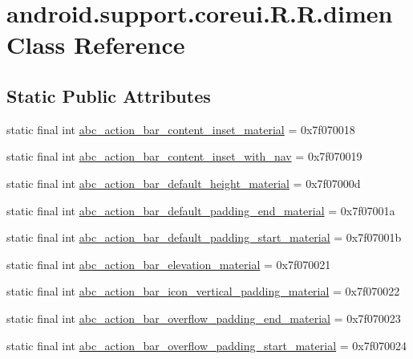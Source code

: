 \hypertarget{classandroid_1_1support_1_1coreui_1_1_r_1_1dimen}{
\section{android.support.coreui.R.R.dimen Class Reference}
\label{classandroid_1_1support_1_1coreui_1_1_r_1_1dimen}
}
\subsection*{Static Public Attributes}
\begin{CompactItemize}
\item 
static final int \hyperlink{classandroid_1_1support_1_1coreui_1_1_r_1_1dimen_fa350275f25a44560f38817ff804a061}{abc\_\-action\_\-bar\_\-content\_\-inset\_\-material} = 0x7f070018
\item 
static final int \hyperlink{classandroid_1_1support_1_1coreui_1_1_r_1_1dimen_1499a2f51bf856a887c30fd877b9d5e7}{abc\_\-action\_\-bar\_\-content\_\-inset\_\-with\_\-nav} = 0x7f070019
\item 
static final int \hyperlink{classandroid_1_1support_1_1coreui_1_1_r_1_1dimen_caaff50f509d06e5db94aa774f7b1ed2}{abc\_\-action\_\-bar\_\-default\_\-height\_\-material} = 0x7f07000d
\item 
static final int \hyperlink{classandroid_1_1support_1_1coreui_1_1_r_1_1dimen_66730a1f40aa895cab3428c160e5e4d1}{abc\_\-action\_\-bar\_\-default\_\-padding\_\-end\_\-material} = 0x7f07001a
\item 
static final int \hyperlink{classandroid_1_1support_1_1coreui_1_1_r_1_1dimen_818c0a80bc19f3c7a2022ad31897beaa}{abc\_\-action\_\-bar\_\-default\_\-padding\_\-start\_\-material} = 0x7f07001b
\item 
static final int \hyperlink{classandroid_1_1support_1_1coreui_1_1_r_1_1dimen_5a1d6fc34d41d8a557a43a7d74b7e91c}{abc\_\-action\_\-bar\_\-elevation\_\-material} = 0x7f070021
\item 
static final int \hyperlink{classandroid_1_1support_1_1coreui_1_1_r_1_1dimen_19c465d67f6e71cab1421af99f91b1e5}{abc\_\-action\_\-bar\_\-icon\_\-vertical\_\-padding\_\-material} = 0x7f070022
\item 
static final int \hyperlink{classandroid_1_1support_1_1coreui_1_1_r_1_1dimen_54084ec37722997f7aae6b2c005fe00a}{abc\_\-action\_\-bar\_\-overflow\_\-padding\_\-end\_\-material} = 0x7f070023
\item 
static final int \hyperlink{classandroid_1_1support_1_1coreui_1_1_r_1_1dimen_1dd1770f50b527dddaa4dfd05992b1cb}{abc\_\-action\_\-bar\_\-overflow\_\-padding\_\-start\_\-material} = 0x7f070024

\end{CompactItemize}
